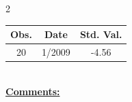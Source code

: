 
\bigskip 
\begin{multicols}{2}{ 
\begin{tabular}{ccc}
\hline  Obs.  &  Date &  Std. Val. \\ 
\hline 
                       20 &        1/2009 &         -4.56 \vspace{-.12in} \\  
 \end{tabular} 
\\ 
 \columnbreak 
 \singlespacing 
 \underline{\textbf{Comments:}} \\ 
 \bigskip       

 } 
\end{multicols} 
